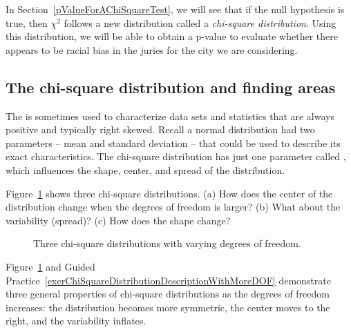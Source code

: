 In Section~\ref{pValueForAChiSquareTest}, we will see that if the null hypothesis is true, then $\chi^2$ follows a new distribution called a \emph{chi-square distribution}. Using this distribution, we will be able to obtain a p-value to evaluate whether there appears to be racial bias in the juries for the city we are considering.

\subsection{The chi-square distribution and finding areas}

The  is sometimes used to characterize data sets and statistics that are always positive and typically right skewed. Recall a normal distribution had two parameters -- mean and standard deviation -- that could be used to describe its exact characteristics. The chi-square distribution has just one parameter called , which influences the shape, center, and spread of the distribution.

\begin{exercisewrap}
\begin{nexercise}\label{exerChiSquareDistributionDescriptionWithMoreDOF}
Figure~\ref{chiSquareDistributionWithInceasingDF} shows three chi-square distributions. (a) How does the center of the distribution change when the degrees of freedom is larger? (b) What about the variability (spread)? (c) How does the shape change?\footnotemark
\end{nexercise}
\end{exercisewrap}


\begin{figure}[h]
\centering
{}
\caption{Three chi-square distributions with varying degrees of freedom.}
\label{chiSquareDistributionWithInceasingDF}
\end{figure}

Figure~\ref{chiSquareDistributionWithInceasingDF} and Guided Practice~\ref{exerChiSquareDistributionDescriptionWithMoreDOF} demonstrate three general properties of chi-square distributions as the degrees of freedom increases: the distribution becomes more symmetric, the center moves to the right, and the variability inflates.

